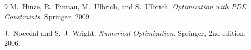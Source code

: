 \documentclass[11pt]{article}
\begin{document}
\begin{thebibliography}{9}
M.~Hinze, R.~Pinnau, M.~Ulbrich, and S.~Ulbrich.
\newblock \textit{Optimization with PDE Constraints}.
\newblock Springer, 2009.

J.~Nocedal and S.~J. Wright.
\newblock \textit{Numerical Optimization}.
\newblock Springer, 2nd edition, 2006.
\end{thebibliography}
\end{document}
